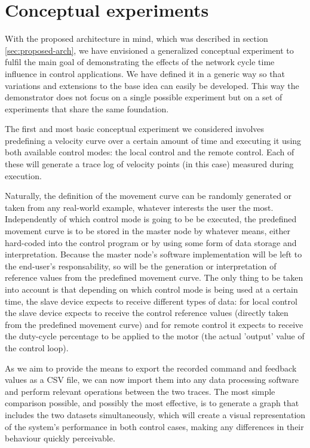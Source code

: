 \section{Conceptual experiments} \label{sec:experiments}

With the proposed architecture in mind, which was described in section \ref{sec:proposed-arch}, we have envisioned a generalized conceptual experiment to fulfil the main goal of demonstrating the effects of the network cycle time influence in control applications.
We have defined it in a generic way so that variations and extensions to the base idea can easily be developed.
This way the demonstrator does not focus on a single possible experiment but on a set of experiments that share the same foundation.

The first and most basic conceptual experiment we considered involves predefining a velocity curve over a certain amount of time and executing it using both available control modes: the local control and the remote control.
Each of these will generate a trace log of velocity points (in this case) measured during execution.

Naturally, the definition of the movement curve can be randomly generated or taken from any real-world example, whatever interests the user the most.
Independently of which control mode is going to be be executed, the predefined movement curve is to be stored in the master node by whatever means, either hard-coded into the control program or by using some form of data storage and interpretation.
Because the master node's software implementation will be left to the end-user's responsability, so will be the generation or interpretation of reference values from the predefined movement curve.
The only thing to be taken into account is that depending on which control mode is being used at a certain time, the slave device expects to receive different types of data: for local control the slave device expects to receive the control reference values (directly taken from the predefined movement curve) and for remote control it expects to receive the duty-cycle percentage to be applied to the motor (the actual 'output' value of the control loop).

As we aim to provide the means to export the recorded command and feedback values as a CSV file, we can now import them into any data processing software and perform relevant operations between the two traces.
The most simple comparison possible, and possibly the most effective, is to generate a graph that includes the two datasets simultaneously, which will create a visual representation of the system's performance in both control cases, making any differences in their behaviour quickly perceivable.

